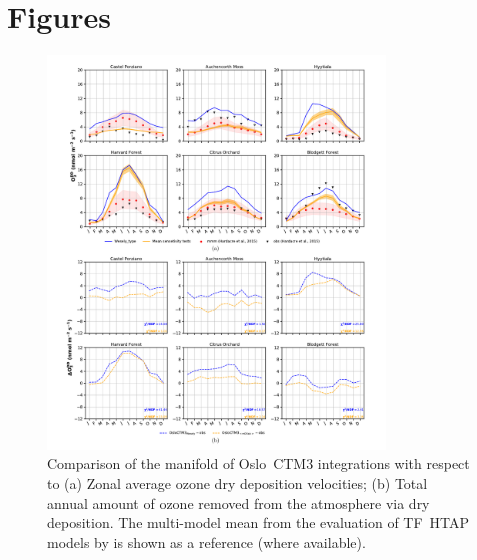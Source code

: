 \documentclass[gmd, manuscript]{copernicus}
\begin{document}
\appendix
\section{Figures}    %

\appendixfigures
\begin{figure}[!htbp]
  \includegraphics[width=0.8\textwidth]{fig09}
  \caption{Comparison of the manifold of Oslo~CTM3 integrations with respect to (a) Zonal average ozone dry deposition velocities; (b) Total annual amount of ozone removed from the atmosphere via dry deposition. The multi-model mean from the evaluation of TF~HTAP models by \citet{ACP:Hardacre2015} is shown as a reference (where available).}
  \label{fig:mmm_drydep_season}
\end{figure}
\end{document}
